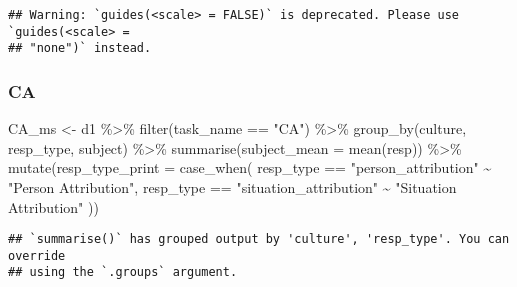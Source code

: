 \documentclass[
]{article}
\newenvironment{Shaded}{\begin{snugshade}}{\end{snugshade}}
\newcommand{\AttributeTok}[1]{\textcolor[rgb]{0.77,0.63,0.00}{#1}}
\newcommand{\FunctionTok}[1]{\textcolor[rgb]{0.00,0.00,0.00}{#1}}
\newcommand{\NormalTok}[1]{#1}
\newcommand{\OtherTok}[1]{\textcolor[rgb]{0.56,0.35,0.01}{#1}}
\newcommand{\SpecialCharTok}[1]{\textcolor[rgb]{0.00,0.00,0.00}{#1}}
\newcommand{\StringTok}[1]{\textcolor[rgb]{0.31,0.60,0.02}{#1}}
\begin{document}
\begin{verbatim}
## Warning: `guides(<scale> = FALSE)` is deprecated. Please use `guides(<scale> =
## "none")` instead.
\end{verbatim}

\hypertarget{ca}{%
\subsubsection{CA}\label{ca}}

\begin{Shaded}
\begin{Highlighting}[]
\NormalTok{CA\_ms }\OtherTok{\textless{}{-}}\NormalTok{ d1 }\SpecialCharTok{\%\textgreater{}\%}
  \FunctionTok{filter}\NormalTok{(task\_name }\SpecialCharTok{==} \StringTok{"CA"}\NormalTok{) }\SpecialCharTok{\%\textgreater{}\%} 
  \FunctionTok{group\_by}\NormalTok{(culture, resp\_type, subject) }\SpecialCharTok{\%\textgreater{}\%}
  \FunctionTok{summarise}\NormalTok{(}\AttributeTok{subject\_mean =} \FunctionTok{mean}\NormalTok{(resp)) }\SpecialCharTok{\%\textgreater{}\%} 
  \FunctionTok{mutate}\NormalTok{(}\AttributeTok{resp\_type\_print =} \FunctionTok{case\_when}\NormalTok{(}
\NormalTok{    resp\_type }\SpecialCharTok{==} \StringTok{"person\_attribution"} \SpecialCharTok{\textasciitilde{}} \StringTok{"Person Attribution"}\NormalTok{, }
\NormalTok{    resp\_type }\SpecialCharTok{==} \StringTok{"situation\_attribution"} \SpecialCharTok{\textasciitilde{}} \StringTok{"Situation Attribution"}
\NormalTok{  ))}
\end{Highlighting}
\end{Shaded}

\begin{verbatim}
## `summarise()` has grouped output by 'culture', 'resp_type'. You can override
## using the `.groups` argument.
\end{verbatim}
\end{document}
